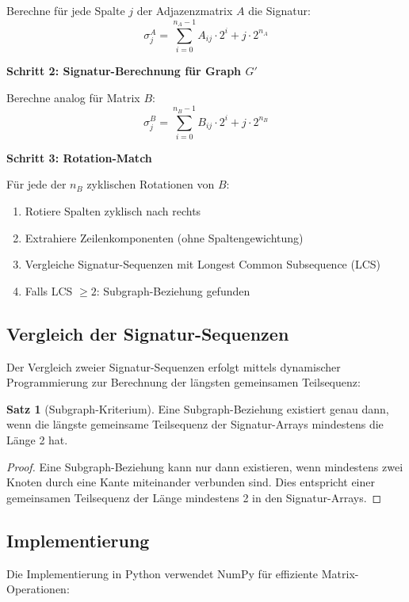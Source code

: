 \documentclass[a4paper,12pt]{article}
\theoremstyle{definition}
\newtheorem{satz}{Satz}
\begin{document}
Berechne für jede Spalte $j$ der Adjazenzmatrix $A$ die Signatur:
\[
\sigma_j^A = \sum_{i=0}^{n_A-1} A_{ij} \cdot 2^i + j \cdot 2^{n_A}
\]

\textbf{Schritt 2: Signatur-Berechnung für Graph $G'$}

Berechne analog für Matrix $B$:
\[
\sigma_j^B = \sum_{i=0}^{n_B-1} B_{ij} \cdot 2^i + j \cdot 2^{n_B}
\]

\textbf{Schritt 3: Rotation-Match}

Für jede der $n_B$ zyklischen Rotationen von $B$:
\begin{enumerate}
	\item Rotiere Spalten zyklisch nach rechts
	\item Extrahiere Zeilenkomponenten (ohne Spaltengewichtung)
	\item Vergleiche Signatur-Sequenzen mit Longest Common Subsequence (LCS)
	\item Falls LCS $\geq 2$: Subgraph-Beziehung gefunden
\end{enumerate}

\subsection{Vergleich der Signatur-Sequenzen}

Der Vergleich zweier Signatur-Sequenzen erfolgt mittels dynamischer Programmierung zur Berechnung der längsten gemeinsamen Teilsequenz:

\begin{satz}[Subgraph-Kriterium]
	Eine Subgraph-Beziehung existiert genau dann, wenn die längste gemeinsame Teilsequenz der Signatur-Arrays mindestens die Länge 2 hat.
\end{satz}

\begin{proof}
	Eine Subgraph-Beziehung kann nur dann existieren, wenn mindestens zwei Knoten durch eine Kante miteinander verbunden sind. Dies entspricht einer gemeinsamen Teilsequenz der Länge mindestens 2 in den Signatur-Arrays.
\end{proof}

\subsection{Implementierung}

Die Implementierung in Python verwendet NumPy für effiziente Matrix-Operationen:
\end{document}
